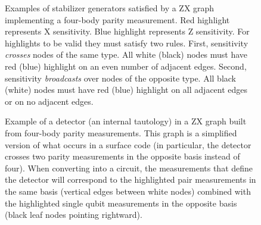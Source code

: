 \documentclass[onecolumn,unpublished,a4paper]{quantumarticle}
\theoremstyle{definition}
\theoremstyle{definition}
\theoremstyle{definition}
\begin{document}
\begin{figure}[h]
    \centering
    \caption{
        Examples of stabilizer generators satisfied by a ZX graph implementing a four-body parity measurement.
        Red highlight represents X sensitivity.
        Blue highlight represents Z sensitivity.
        For highlights to be valid they must satisfy two rules.
        First, sensitivity \emph{crosses} nodes of the same type.
        All white (black) nodes must have red (blue) highlight on an even number of adjacent edges.
        Second, sensitivity \emph{broadcasts} over nodes of the opposite type.
        All black (white) nodes must have red (blue) highlight on all adjacent edges or on no adjacent edges.
    }
    \label{fig:zx_stabilizer_examples}
\end{figure}

\begin{figure}[h]
    \centering
    \caption{
        Example of a detector (an internal tautology) in a ZX graph built from four-body parity measurements.
        This graph is a simplified version of what occurs in a surface code (in particular, the detector crosses two parity measurements in the opposite basis instead of four).
        When converting into a circuit, the measurements that define the detector will correspond to the highlighted pair measurements in the same basis (vertical edges between white nodes) combined with the highlighted single qubit measurements in the opposite basis (black leaf nodes pointing rightward).
    }
    \label{fig:zx_detector_example}
\end{figure}
\end{document}
